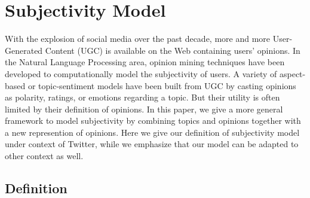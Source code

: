 \documentclass[letterpaper]{article}
\begin{document}
\section{Subjectivity Model}
\label{subjectivemodel}

With the explosion of social media over the past decade, more and more User-Generated Content (UGC) is available on the Web containing users' opinions.
In the Natural Language Processing area, opinion mining techniques\cite{liu2012sentiment} have been developed to computationally model the subjectivity of users. A variety of aspect-based or topic-sentiment models have been built from UGC by casting opinions as polarity, ratings, or emotions regarding a topic\cite{lek2013aspect,mei2007topic}. But their utility is often limited by their definition of opinions. In this paper, we give a more general framework to model subjectivity by combining topics and opinions together with a new represention of opinions. Here we give our definition of subjectivity model under context of Twitter, while we emphasize that our model can be adapted to other context as well.

\subsection{Definition}
\label{definition}
\end{document}
